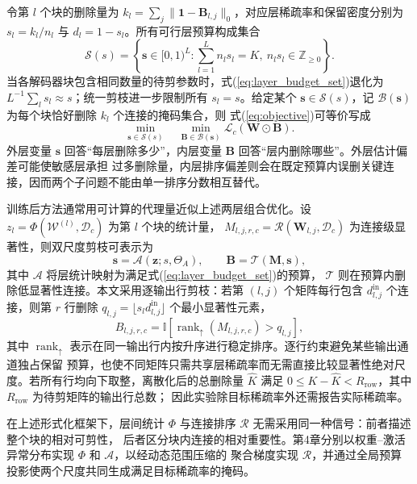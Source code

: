 \documentclass[UTF8,fontset=fandol]{ctexart}
\begin{document}
令第 $l$ 个块的删除量为
$k_l=\sum_j\|\bm 1-\bm B_{l,j}\|_0$，对应层稀疏率和保留密度分别为
$s_l=k_l/n_l$ 与 $d_l=1-s_l$。所有可行层预算构成集合
\begin{equation}
\mathcal S(s)=
\left\{
\bm s\in[0,1)^L:
\sum_{l=1}^{L}n_ls_l=K,\ 
n_ls_l\in\mathbb Z_{\geq 0}
\right\}.
\label{eq:layer_budget_set}
\end{equation}
当各解码器块包含相同数量的待剪参数时，式(\ref{eq:layer_budget_set})退化为
$L^{-1}\sum_l s_l\approx s$；统一剪枝进一步限制所有 $s_l=s$。给定某个
$\bm s\in\mathcal S(s)$，记 $\mathcal B(\bm s)$ 为每个块恰好删除 $k_l$ 个连接的掩码集合，则
式(\ref{eq:objective})可等价写成
\begin{equation}
\min_{\bm s\in\mathcal S(s)}
\quad
\min_{\bm B\in\mathcal B(\bm s)}
\mathcal L_c(\bm W\odot\bm B).
\label{eq:nested_objective}
\end{equation}
外层变量 $\bm s$ 回答“每层删除多少”，内层变量 $\bm B$ 回答“层内删除哪些”。外层估计偏差可能使敏感层承担
过多删除量，内层排序偏差则会在既定预算内误删关键连接，因而两个子问题不能由单一排序分数相互替代。

训练后方法通常用可计算的代理量近似上述两层组合优化。设
$z_l=\Phi(\mathcal W^{(l)},\mathcal D_c)$ 为第 $l$ 个块的统计量，
$M_{l,j,r,c}=\mathcal R(\bm W_{l,j},\mathcal D_c)$ 为连接级显著性，则双尺度剪枝可表示为
\begin{equation}
\bm s=\mathcal A(\bm z;s,\Theta_A),
\qquad
\bm B=\mathcal T(\bm M,\bm s),
\label{eq:dual_scale_mapping}
\end{equation}
其中 $\mathcal A$ 将层统计映射为满足式(\ref{eq:layer_budget_set})的预算，
$\mathcal T$ 则在预算内删除低显著性连接。本文采用逐输出行剪枝：若第 $(l,j)$ 个矩阵每行包含
$d_{l,j}^{\mathrm{in}}$ 个连接，则第 $r$ 行删除
$q_{l,j}=\lfloor s_ld_{l,j}^{\mathrm{in}}\rfloor$ 个最小显著性元素，
\begin{equation}
B_{l,j,r,c}
=
\mathbb I\!\left[
\operatorname{rank}_{\uparrow}
\!\left(M_{l,j,r,c}\right)>q_{l,j}
\right],
\label{eq:rowwise_mask}
\end{equation}
其中 $\operatorname{rank}_{\uparrow}$ 表示在同一输出行内按升序进行稳定排序。逐行约束避免某些输出通道独占保留
预算，也使不同矩阵只需共享层稀疏率而无需直接比较显著性绝对尺度。若所有行均向下取整，离散化后的总删除量
$\widehat K$ 满足 $0\leq K-\widehat K<R_{\mathrm{row}}$，其中 $R_{\mathrm{row}}$ 为待剪矩阵的输出行总数；
因此实验除目标稀疏率外还需报告实际稀疏率。

在上述形式化框架下，层间统计 $\Phi$ 与连接排序 $\mathcal R$ 无需采用同一种信号：前者描述整个块的相对可剪性，
后者区分块内连接的相对重要性。第4章分别以权重--激活异常分布实现 $\Phi$ 和 $\mathcal A$，以经动态范围压缩的
聚合梯度实现 $\mathcal R$，并通过全局预算投影使两个尺度共同生成满足目标稀疏率的掩码。
\end{document}
